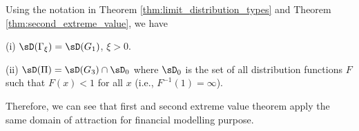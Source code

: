 \begin{theorem}\label{thm:second_domain_of_attraction}
Using the notation in Theorem \ref{thm:limit_distribution_types} and Theorem \ref{thm:second_extreme_value}, we have
\ben
\item [(i)] $\sD(\Gamma_{\xi}) = \sD(G_1)$, $\xi >0$.
\item [(ii)] $\sD(\Pi) = \sD(G_3) \cap \sD_0$ where $\sD_0$ is the set of all distribution functions $F$ such that $F(x)<1$ for all $x$ (i.e., $F^{-1}(1) = \infty$).
\een
\end{theorem}

Therefore, we can see that first and second extreme value theorem apply the same domain of attraction for financial modelling purpose.




